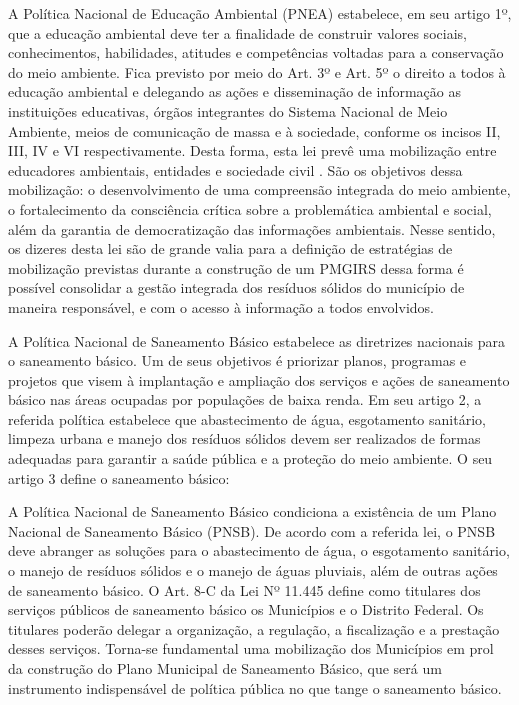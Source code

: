 	A Política Nacional de Educação Ambiental (PNEA) estabelece, em seu artigo 1º, que a educação ambiental deve ter a finalidade de construir valores sociais, conhecimentos, habilidades, atitudes e competências voltadas para a conservação do meio ambiente. Fica previsto por meio do Art. 3º e Art. 5º o direito a todos à educação ambiental e delegando as ações e disseminação de informação as instituições educativas, órgãos integrantes do Sistema Nacional de Meio Ambiente, meios de comunicação de massa e à sociedade, conforme os incisos II, III, IV e VI respectivamente. Desta forma, esta lei prevê uma mobilização entre educadores ambientais, entidades e sociedade civil \cite{brasil:9795}. São os objetivos dessa mobilização: o desenvolvimento de uma compreensão integrada do meio ambiente, o fortalecimento da consciência crítica sobre a problemática ambiental e social, além da garantia de democratização das informações ambientais.  Nesse sentido, os dizeres desta lei são de grande valia para a definição de estratégias de mobilização previstas durante a construção de um PMGIRS dessa forma é possível consolidar a gestão integrada dos resíduos sólidos do município de maneira responsável, e com o acesso à informação a todos envolvidos.
	
	A Política Nacional de Saneamento Básico estabelece as diretrizes nacionais para o saneamento básico. Um de seus objetivos é priorizar planos, programas e projetos que visem à implantação e ampliação dos serviços e ações de saneamento básico nas áreas ocupadas por populações de baixa renda. Em seu artigo 2, a referida política estabelece que abastecimento de água, esgotamento sanitário, limpeza urbana e manejo dos resíduos sólidos devem ser realizados de formas adequadas para garantir a saúde pública e a proteção do meio ambiente. O seu artigo 3 define o saneamento básico:
	
	A Política Nacional de Saneamento Básico condiciona a existência de um Plano Nacional de Saneamento Básico (PNSB). De acordo com a referida lei, o PNSB deve abranger as soluções para o abastecimento de água, o esgotamento sanitário, o manejo de resíduos sólidos e o manejo de águas pluviais, além de outras ações de saneamento básico. O Art. 8-C da Lei Nº 11.445 define como titulares dos serviços públicos de saneamento básico os Municípios e o Distrito Federal. Os titulares poderão delegar a organização, a regulação, a fiscalização e a prestação desses serviços. Torna-se fundamental uma mobilização dos Municípios em prol da construção do Plano Municipal de Saneamento Básico, que será um instrumento indispensável de política pública no que tange o saneamento básico.
	
